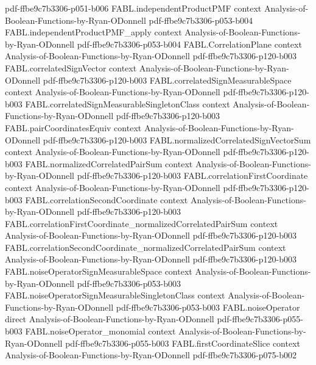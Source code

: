\begin{theorem}
  {pdf-ffbe9c7b3306-p051-b006}
\proofstep
  {FABL.independentProductPMF}
  {context}
  {Analysis-of-Boolean-Functions-by-Ryan-ODonnell}
  {pdf-ffbe9c7b3306-p053-b004}
\proofstep
  {FABL.independentProductPMF_apply}
  {context}
  {Analysis-of-Boolean-Functions-by-Ryan-ODonnell}
  {pdf-ffbe9c7b3306-p053-b004}
\proofstep
  {FABL.CorrelationPlane}
  {context}
  {Analysis-of-Boolean-Functions-by-Ryan-ODonnell}
  {pdf-ffbe9c7b3306-p120-b003}
\proofstep
  {FABL.correlatedSignVector}
  {context}
  {Analysis-of-Boolean-Functions-by-Ryan-ODonnell}
  {pdf-ffbe9c7b3306-p120-b003}
\proofstep
  {FABL.correlatedSignMeasurableSpace}
  {context}
  {Analysis-of-Boolean-Functions-by-Ryan-ODonnell}
  {pdf-ffbe9c7b3306-p120-b003}
\proofstep
  {FABL.correlatedSignMeasurableSingletonClass}
  {context}
  {Analysis-of-Boolean-Functions-by-Ryan-ODonnell}
  {pdf-ffbe9c7b3306-p120-b003}
\proofstep
  {FABL.pairCoordinatesEquiv}
  {context}
  {Analysis-of-Boolean-Functions-by-Ryan-ODonnell}
  {pdf-ffbe9c7b3306-p120-b003}
\proofstep
  {FABL.normalizedCorrelatedSignVectorSum}
  {context}
  {Analysis-of-Boolean-Functions-by-Ryan-ODonnell}
  {pdf-ffbe9c7b3306-p120-b003}
\proofstep
  {FABL.normalizedCorrelatedPairSum}
  {context}
  {Analysis-of-Boolean-Functions-by-Ryan-ODonnell}
  {pdf-ffbe9c7b3306-p120-b003}
\proofstep
  {FABL.correlationFirstCoordinate}
  {context}
  {Analysis-of-Boolean-Functions-by-Ryan-ODonnell}
  {pdf-ffbe9c7b3306-p120-b003}
\proofstep
  {FABL.correlationSecondCoordinate}
  {context}
  {Analysis-of-Boolean-Functions-by-Ryan-ODonnell}
  {pdf-ffbe9c7b3306-p120-b003}
\proofstep
  {FABL.correlationFirstCoordinate_normalizedCorrelatedPairSum}
  {context}
  {Analysis-of-Boolean-Functions-by-Ryan-ODonnell}
  {pdf-ffbe9c7b3306-p120-b003}
\proofstep
  {FABL.correlationSecondCoordinate_normalizedCorrelatedPairSum}
  {context}
  {Analysis-of-Boolean-Functions-by-Ryan-ODonnell}
  {pdf-ffbe9c7b3306-p120-b003}
\proofstep
  {FABL.noiseOperatorSignMeasurableSpace}
  {context}
  {Analysis-of-Boolean-Functions-by-Ryan-ODonnell}
  {pdf-ffbe9c7b3306-p053-b003}
\proofstep
  {FABL.noiseOperatorSignMeasurableSingletonClass}
  {context}
  {Analysis-of-Boolean-Functions-by-Ryan-ODonnell}
  {pdf-ffbe9c7b3306-p053-b003}
\proofstep
  {FABL.noiseOperator}
  {direct}
  {Analysis-of-Boolean-Functions-by-Ryan-ODonnell}
  {pdf-ffbe9c7b3306-p055-b003}
\proofstep
  {FABL.noiseOperator_monomial}
  {context}
  {Analysis-of-Boolean-Functions-by-Ryan-ODonnell}
  {pdf-ffbe9c7b3306-p055-b003}
\proofstep
  {FABL.firstCoordinateSlice}
  {context}
  {Analysis-of-Boolean-Functions-by-Ryan-ODonnell}
  {pdf-ffbe9c7b3306-p075-b002}

\end{theorem}
